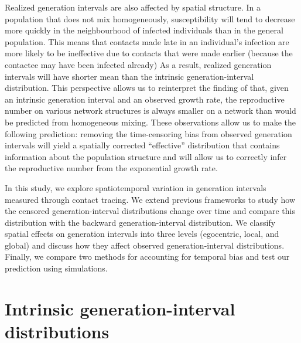 \documentclass[12pt]{article}
\begin{document}
Realized generation intervals are also affected by spatial structure.
In a population that does not mix homogeneously, susceptibility will tend to decrease more quickly in the neighbourhood of infected individuals than in the general population. 
This means that contacts made late in an individual's infection are more likely to be ineffective due to contacts that were made earlier (because the contactee may have been infected already) 
As a result, realized generation intervals will have shorter mean than the intrinsic generation-interval distribution.
This perspective allows us to reinterpret the finding of \cite{trapman2016inferring} that, given an intrinsic generation interval and an observed growth rate, the reproductive number on various network structures is always smaller on a network than would be predicted from homogeneous mixing.
These observations allow us to make the following prediction: removing the time-censoring bias from observed generation intervals will yield a spatially corrected ``effective'' distribution that contains information about the population structure and will allow us to correctly infer the reproductive number from the exponential growth rate.

In this study, we explore spatiotemporal variation in generation intervals measured through contact tracing.
We extend previous frameworks to study how the censored generation-interval distributions change over time and compare this distribution with the backward generation-interval distribution.
We classify spatial effects on generation intervals into three levels (egocentric, local, and global) and discuss how they affect observed generation-interval distributions.
Finally, we compare two methods for accounting for temporal bias and test our prediction using simulations.

\section{Intrinsic generation-interval distributions}
\end{document}

